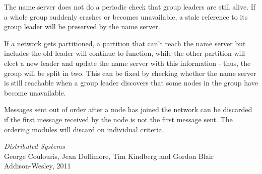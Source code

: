 \documentclass[10pt, oneside]{article}
\begin{document}
The name server does not do a periodic check that group leaders are still
alive. If a whole group suddenly crashes or becomes unavailable, a stale
reference to its group leader will be preserved by the name server.

If a network gets partitioned, a partition that can't reach the name server but
includes the old leader will continue to function, while the other partition
will elect a new leader and update the name server with this information - thus,
the group will be split in two. This can be fixed by checking whether the name
server is still reachable when a group leader discovers that some nodes in the
group have become unavailable.

Messages sent out of order after a node has joined the network can be discarded
if the first message received by the node is not the first message sent. The
ordering modules will discard on individual criteria.

\pagebreak

\begin{thebibliography}{9}

 \emph{Distributed Systems}\\
\newblock George Coulouris, Jean Dollimore, Tim Kindberg and Gordon Blair\\
\newblock Addison-Wesley, 2011\\

\end{thebibliography}
\end{document}
